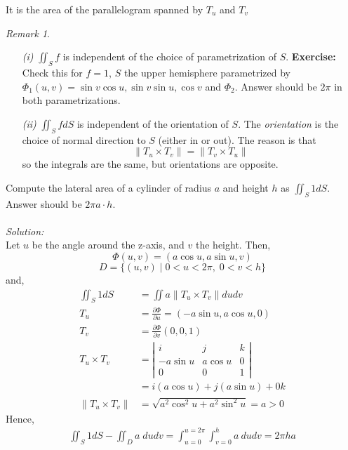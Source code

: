 \documentclass[12pt]{book}
\theoremstyle{definition}
\theoremstyle{remark}
\newtheorem*{remark}{Remark}
\newcommand\sol{%
  \\ 
  \\
  \textit{Solution:}\\%
}
\begin{document}
It is the area of the parallelogram spanned by $T_u$ and $T_v$ 
\begin{remark} 
  $  $
  \begin{enumerate}
    \item[\it (i)] $\iint_S f$ is independent of the choice of parametrization of $S.$
    \newline 
    \noindent \textbf{Exercise:} Check this for $f = 1$, $S$ the upper hemisphere parametrized by $\Phi_1 (u,v) = \sin v \cos u, \sin v \sin u , \cos v$ and $\Phi_2$. Answer should be $2\pi$ in both parametrizations.
    \item[\it (ii)] $\iint_S f dS$ is independent of the orientation of $S$. The \textit{orientation} is the choice of normal direction to $S$ (either in or out). The reason is that 
    $$\| T_u \times T_v \| = \| T_v \times T_u \| $$
    so the integrals are the same, but orientations are opposite. 
  \end{enumerate}
\end{remark}
\begin{example}Compute the lateral area of a cylinder of radius $a$ and height $h$ as $\iint_S 1 dS$. Answer should be $2 \pi a \cdot {h}.$ 
  \sol 
  Let $u$ be the angle around the z-axis, and $v$ the height. Then, $$\Phi(u,v) = (a \cos u , a \sin u , v) $$
  $$D = \{ (u,v) \mid 0 < u < 2 \pi, \; 0 < v< h \} $$
  and, 
  \begin{equation*}
    \begin{split}
      \iint_S 1 dS &= \iint a \| T_u \times T_v \| du dv \\ 
      T_u &= \frac{\partial {\Phi}}{\partial {u}}  = ( -a \sin u , a \cos u , 0 ) \\ 
      T_v &= \frac{\partial {\Phi}}{\partial {v}} (0,0,1)\\ 
      T_u \times T_v &= \left| \begin{matrix}
        i & j& k \\ -a \sin u & a \cos u & 0 \\ 0 & 0 & 1
      \end{matrix}  \right| \\ 
      &= i (a \cos u) + j(a \sin u ) + 0 k \\ 
      \| T_u \times T_v \| &= \sqrt{a^2 \cos^2 u + a^2 \sin^2 u} = a > 0
    \end{split}
  \end{equation*} 
  Hence, 
  \begin{equation*}
    \begin{split}
      \iint_S 1 dS - \iint_D a \; du dv = \int_{{u=0}}^{{u=2 \pi}} \int_{v = 0}^{h} a \: d{u} {dv} = 2 \pi h a 
    \end{split}
  \end{equation*}
\end{example}
\end{document}
